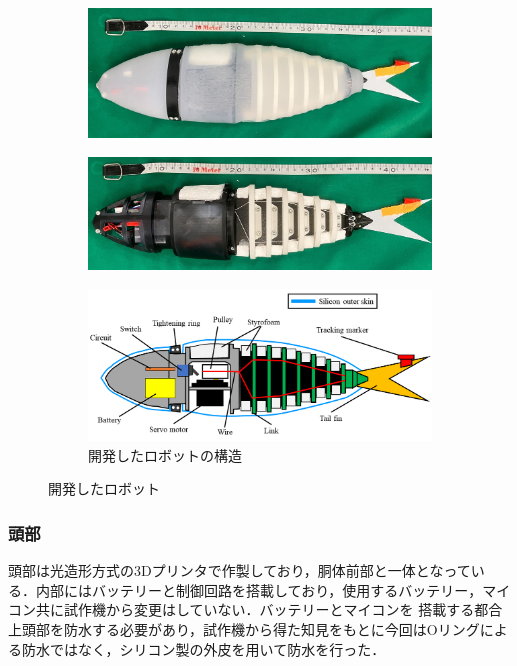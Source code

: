 \begin{figure}[htbp]
    \centering  
    \begin{subfigure}[b]{0.9\linewidth}
        \centering
        \includegraphics[width=0.9\linewidth]{chapters/picture/withskin.jpg}
        \label{fig:fishrobo_with}
    \end{subfigure}
    \begin{subfigure}[b]{0.9\linewidth}
        \centering
        \includegraphics[width=0.9\linewidth]{chapters/picture/skinless.jpg}
        \label{fig:fishrobo_less}
    \end{subfigure}
    \begin{subfigure}[b]{0.9\linewidth}
        \centering
        \includegraphics[width=0.9\linewidth]{chapters/picture/fish.png}
        \caption{開発したロボットの構造}
        \label{fig:kouzou}
    \end{subfigure}
    \caption{開発したロボット}
    \label{fig:gaikan}
\end{figure}

\subsubsection{頭部}
頭部は光造形方式の3Dプリンタで作製しており，胴体前部と一体となっている．内部にはバッテリーと制御回路を搭載しており，使用するバッテリー，マイコン共に試作機から変更はしていない．バッテリーとマイコンを
搭載する都合上頭部を防水する必要があり，試作機から得た知見をもとに今回はOリングによる防水ではなく，シリコン製の外皮を用いて防水を行った．

